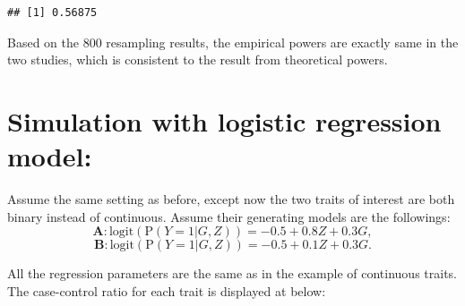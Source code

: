 \documentclass[
]{article}
\begin{document}
\begin{verbatim}
## [1] 0.56875
\end{verbatim}

Based on the \(800\) resampling results, the empirical powers are
exactly same in the two studies, which is consistent to the result from
theoretical powers.

\hypertarget{simulation-with-logistic-regression-model}{%
\section{Simulation with logistic regression
model:}\label{simulation-with-logistic-regression-model}}

Assume the same setting as before, except now the two traits of interest
are both binary instead of continuous. Assume their generating models
are the followings:
\[\textbf{A}:\text{logit}(\text{P}(Y=1|G,Z)) = -0.5 + 0.8Z + 0.3G,\]
\[\textbf{B}: \text{logit}(\text{P}(Y=1|G,Z)) = -0.5 + 0.1Z + 0.3G.\]

All the regression parameters are the same as in the example of
continuous traits. The case-control ratio for each trait is displayed at
below:
\end{document}
